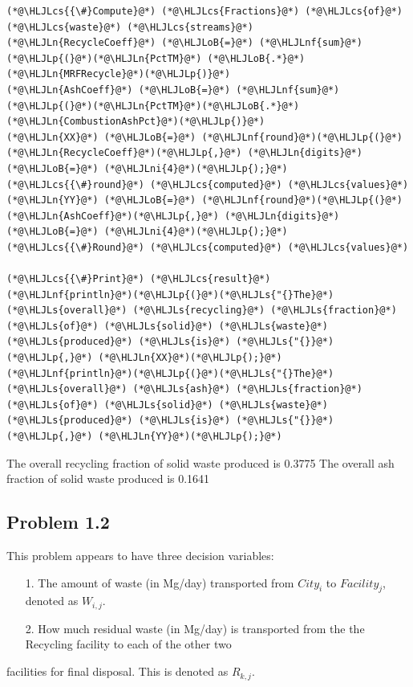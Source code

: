 \documentclass[12pt,a4paper]{article}
\newcommand{\HLJLn}[1]{#1}
\newcommand{\HLJLnf}[1]{\textcolor[RGB]{66,102,213}{#1}}
\newcommand{\HLJLs}[1]{\textcolor[RGB]{201,61,57}{#1}}
\newcommand{\HLJLni}[1]{\textcolor[RGB]{59,151,46}{#1}}
\newcommand{\HLJLoB}[1]{\textcolor[RGB]{102,102,102}{\textbf{#1}}}
\newcommand{\HLJLp}[1]{#1}
\newcommand{\HLJLcs}[1]{\textcolor[RGB]{153,153,119}{\textit{#1}}}
\begin{document}
\begin{lstlisting}
(*@\HLJLcs{{\#}Compute}@*) (*@\HLJLcs{Fractions}@*) (*@\HLJLcs{of}@*) (*@\HLJLcs{waste}@*) (*@\HLJLcs{streams}@*)
(*@\HLJLn{RecycleCoeff}@*) (*@\HLJLoB{=}@*) (*@\HLJLnf{sum}@*)(*@\HLJLp{(}@*)(*@\HLJLn{PctTM}@*) (*@\HLJLoB{.*}@*) (*@\HLJLn{MRFRecycle}@*)(*@\HLJLp{)}@*)
(*@\HLJLn{AshCoeff}@*) (*@\HLJLoB{=}@*) (*@\HLJLnf{sum}@*)(*@\HLJLp{(}@*)(*@\HLJLn{PctTM}@*)(*@\HLJLoB{.*}@*) (*@\HLJLn{CombustionAshPct}@*)(*@\HLJLp{)}@*)
(*@\HLJLn{XX}@*) (*@\HLJLoB{=}@*) (*@\HLJLnf{round}@*)(*@\HLJLp{(}@*)(*@\HLJLn{RecycleCoeff}@*)(*@\HLJLp{,}@*) (*@\HLJLn{digits}@*) (*@\HLJLoB{=}@*) (*@\HLJLni{4}@*)(*@\HLJLp{);}@*) (*@\HLJLcs{{\#}round}@*) (*@\HLJLcs{computed}@*) (*@\HLJLcs{values}@*)
(*@\HLJLn{YY}@*) (*@\HLJLoB{=}@*) (*@\HLJLnf{round}@*)(*@\HLJLp{(}@*)(*@\HLJLn{AshCoeff}@*)(*@\HLJLp{,}@*) (*@\HLJLn{digits}@*) (*@\HLJLoB{=}@*) (*@\HLJLni{4}@*)(*@\HLJLp{);}@*) (*@\HLJLcs{{\#}Round}@*) (*@\HLJLcs{computed}@*) (*@\HLJLcs{values}@*)

(*@\HLJLcs{{\#}Print}@*) (*@\HLJLcs{result}@*)
(*@\HLJLnf{println}@*)(*@\HLJLp{(}@*)(*@\HLJLs{"{}The}@*) (*@\HLJLs{overall}@*) (*@\HLJLs{recycling}@*) (*@\HLJLs{fraction}@*) (*@\HLJLs{of}@*) (*@\HLJLs{solid}@*) (*@\HLJLs{waste}@*) (*@\HLJLs{produced}@*) (*@\HLJLs{is}@*) (*@\HLJLs{"{}}@*)(*@\HLJLp{,}@*) (*@\HLJLn{XX}@*)(*@\HLJLp{);}@*)
(*@\HLJLnf{println}@*)(*@\HLJLp{(}@*)(*@\HLJLs{"{}The}@*) (*@\HLJLs{overall}@*) (*@\HLJLs{ash}@*) (*@\HLJLs{fraction}@*) (*@\HLJLs{of}@*) (*@\HLJLs{solid}@*) (*@\HLJLs{waste}@*) (*@\HLJLs{produced}@*) (*@\HLJLs{is}@*) (*@\HLJLs{"{}}@*)(*@\HLJLp{,}@*) (*@\HLJLn{YY}@*)(*@\HLJLp{);}@*)
\end{lstlisting}

The overall recycling fraction of solid waste produced is 0.3775
The overall ash fraction of solid waste produced is 0.1641


\subsection{Problem 1.2}
This problem appears to have three decision variables: 

\begin{itemize}
\item[1. ] The amount of waste (in Mg/day) transported from $City_i$ to $Facility_j$, denoted as $W_{i,j}$.


\item[2. ] How much residual waste (in Mg/day) is transported from the the Recycling facility to each of the other two

\end{itemize}
facilities for final disposal. This is denoted as $R_{k,j}$.
\end{document}
